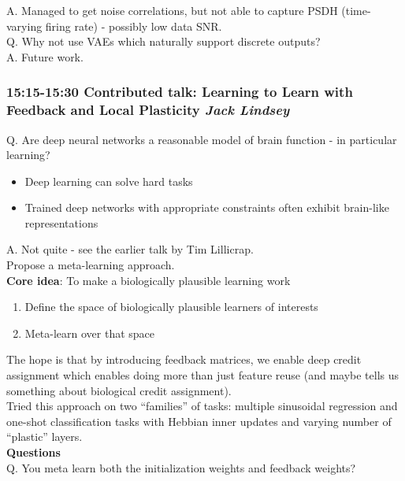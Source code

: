 \documentclass[12pt]{article}
\begin{document}
A. Managed to get noise correlations, but not able to capture PSDH (time-varying firing rate) - possibly low data SNR. \\

Q. Why not use VAEs which naturally support discrete outputs? \\

A. Future work.


\subsubsection{15:15-15:30 Contributed talk: Learning to Learn with Feedback and Local Plasticity \textit{Jack Lindsey}}

Q. Are deep neural networks a reasonable model of brain function - in particular learning?
\begin{itemize}
    \item Deep learning can solve hard tasks
    \item Trained deep networks with appropriate constraints often exhibit brain-like representations
\end{itemize}
A. Not quite - see the earlier talk by Tim Lillicrap. \\

Propose a meta-learning approach. \\

\textbf{Core idea}: To make a biologically plausible learning work 
\begin{enumerate}
    \item Define the space of biologically plausible learners of interests
    \item Meta-learn over that space
\end{enumerate}
The hope is that by introducing feedback matrices, we enable deep credit assignment which enables doing more than just feature reuse (and maybe tells us something about biological credit assignment). \\

Tried this approach on two ``families'' of tasks: multiple sinusoidal regression and one-shot classification tasks with Hebbian inner updates and varying number of ``plastic'' layers. \\

\textbf{Questions} \\ 

Q. You meta learn both the initialization weights and feedback weights? \\
\end{document}
